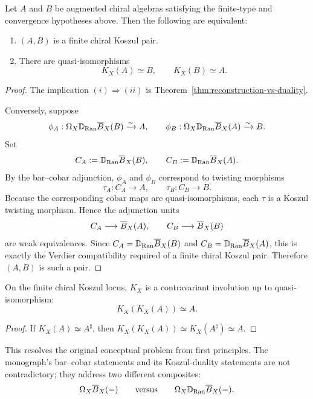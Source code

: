 \begin{theorem}\label{thm:recognition}
Let \(A\) and \(B\) be augmented chiral algebras satisfying the finite-type and convergence hypotheses above. Then the following are equivalent:
\begin{enumerate}[label=\textup{(\roman*)},leftmargin=2.4em]
\item \((A,B)\) is a finite chiral Koszul pair.
\item There are quasi-isomorphisms
\[
K_X(A)\simeq B,\qquad K_X(B)\simeq A.
\]
\end{enumerate}
\end{theorem}

\begin{proof}
The implication \((i)\Rightarrow(ii)\) is Theorem~\ref{thm:reconstruction-vs-duality}.

Conversely, suppose
\[
\phi_A:\Omega_X\mathbb D_{\operatorname{Ran}}\overline{B}_X(B)\xrightarrow{\sim} A,
\qquad
\phi_B:\Omega_X\mathbb D_{\operatorname{Ran}}\overline{B}_X(A)\xrightarrow{\sim} B.
\]
Set
\[
C_A:=\mathbb D_{\operatorname{Ran}}\overline{B}_X(B),\qquad C_B:=\mathbb D_{\operatorname{Ran}}\overline{B}_X(A).
\]
By the bar--cobar adjunction, \(\phi_A\) and \(\phi_B\) correspond to twisting morphisms
\[
\tau_A:C_A\to A,\qquad \tau_B:C_B\to B.
\]
Because the corresponding cobar maps are quasi-isomorphisms, each \(\tau\) is a Koszul twisting morphism. Hence the adjunction units
\[
C_A\longrightarrow \overline{B}_X(A),
\qquad
C_B\longrightarrow \overline{B}_X(B)
\]
are weak equivalences. Since \(C_A=\mathbb D_{\operatorname{Ran}}\overline{B}_X(B)\) and \(C_B=\mathbb D_{\operatorname{Ran}}\overline{B}_X(A)\), this is exactly the Verdier compatibility required of a finite chiral Koszul pair. Therefore \((A,B)\) is such a pair.
\end{proof}

\begin{corollary}
On the finite chiral Koszul locus, \(K_X\) is a contravariant involution up to quasi-isomorphism:
\[
K_X(K_X(A))\simeq A.
\]
\end{corollary}

\begin{proof}
If \(K_X(A)\simeq A^\sharp\), then \(K_X(K_X(A))\simeq K_X(A^\sharp)\simeq A\).
\end{proof}

\begin{remark}
This resolves the original conceptual problem from first principles. The monograph's bar--cobar statements and its Koszul-duality statements are not contradictory; they address two different composites:
\[
\Omega_X\overline{B}_X(-)
\qquad\text{versus}\qquad
\Omega_X\mathbb D_{\operatorname{Ran}}\overline{B}_X(-).
\]
\end{remark}

